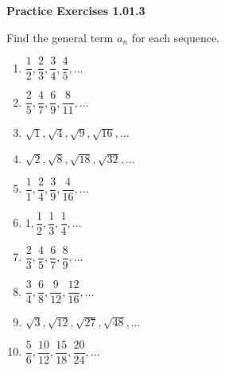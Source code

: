 \vspace{0.3ex}
\noindent\textbf{Practice Exercises 1.01.3}

\vspace{0.2ex}

Find the general term $a_n$ for each sequence.
\begin{multicols}{2}
\begin{enumerate}
    \item $\dfrac{1}{2}, \dfrac{2}{3}, \dfrac{3}{4}, \dfrac{4}{5}, \dots$
    \item $\dfrac{2}{5}, \dfrac{4}{7}, \dfrac{6}{9}, \dfrac{8}{11}, \dots$
    \item $\sqrt{1}, \sqrt{4}, \sqrt{9}, \sqrt{16}, \dots$
    \item $\sqrt{2}, \sqrt{8}, \sqrt{18}, \sqrt{32}, \dots$
    \item $\dfrac{1}{1}, \dfrac{2}{4}, \dfrac{3}{9}, \dfrac{4}{16}, \dots$
    \item $1, \dfrac{1}{2}, \dfrac{1}{3}, \dfrac{1}{4}, \dots$
    \item $\dfrac{2}{3}, \dfrac{4}{5}, \dfrac{6}{7}, \dfrac{8}{9}, \dots$
    \item $\dfrac{3}{4}, \dfrac{6}{8}, \dfrac{9}{12}, \dfrac{12}{16}, \dots$
    \item $\sqrt{3}, \sqrt{12}, \sqrt{27}, \sqrt{48}, \dots$
    \item $\dfrac{5}{6}, \dfrac{10}{12}, \dfrac{15}{18}, \dfrac{20}{24}, \dots$
    \end{enumerate}
    \end{multicols}
